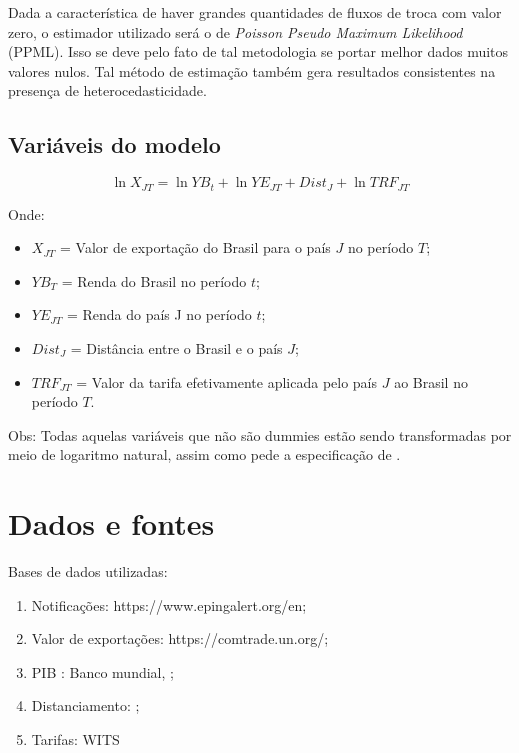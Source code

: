 \documentclass[12pt, a4paper]{article}
\begin{document}
Dada a característica de haver grandes quantidades de fluxos de troca com valor zero, o estimador utilizado será o de \emph{Poisson Pseudo Maximum Likelihood} (PPML). Isso se deve pelo fato de tal metodologia se portar melhor dados muitos valores nulos. Tal método de estimação também gera resultados consistentes na presença de heterocedasticidade. 

\subsection{Variáveis do modelo}

\begin{equation}
    \ln X_{JT} = \ln YB_t + \ln YE_{JT} + Dist_J + \ln TRF_{JT} 
\end{equation}

Onde:

\begin{itemize}
    \item $X_{JT}$ = Valor de exportação do Brasil para o país $J$ no período $T$;
    \item $YB_T$ = Renda do Brasil no período $t$;
    \item $YE_{JT}$ = Renda do país J no período $t$;
    \item $Dist_J$ = Distância entre o Brasil e o país $J$;
    \item $TRF_{JT}$ = Valor da tarifa efetivamente aplicada pelo país $J$ ao Brasil no período $T$.
\end{itemize}

Obs: Todas aquelas variáveis que não são dummies estão sendo transformadas por meio de logaritmo natural, assim como pede a especificação de \cite{Log_Of_Gravity}.


\section{Dados e fontes}

Bases de dados utilizadas:

\begin{enumerate}
    \item Notificações: https://www.epingalert.org/en;
    \item Valor de exportações: https://comtrade.un.org/;
    \item PIB : Banco mundial, \cite{WB};
    \item Distanciamento: \cite{CEPII};
    \item Tarifas: WITS
\end{enumerate}

\printbibliography
\end{document}
